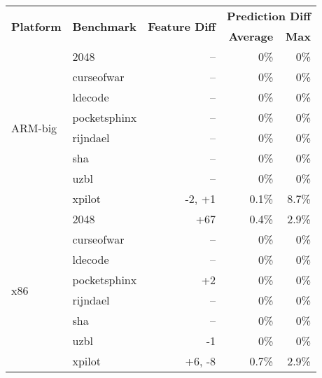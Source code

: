 \begin{tabular}{|l|l|r|r|r|}

\hline
\multirow{2}{*}{\bf Platform} & \multirow{2}{*}{\bf Benchmark} & \multirow{2}{*}{\bf Feature Diff} & \multicolumn{2}{r|}{\bf Prediction Diff} \\ \cline{4-5}
& & & {\bf Average} & {\bf Max} \\ \hline\hline

\multirow{8}{*}{ARM-big}
& 2048         & --     & 0\%   & 0\%   \\ \cline{2-5}
& curseofwar   & --     & 0\%   & 0\%   \\ \cline{2-5}
& ldecode      & --     & 0\%   & 0\%   \\ \cline{2-5}
& pocketsphinx & --     & 0\%   & 0\%   \\ \cline{2-5}
& rijndael     & --     & 0\%   & 0\%   \\ \cline{2-5}
& sha          & --     & 0\%   & 0\%   \\ \cline{2-5}
& uzbl         & --     & 0\%   & 0\%   \\ \cline{2-5}
& xpilot       & -2, +1 & 0.1\% & 8.7\% \\ \hline\hline

\multirow{8}{*}{x86}
& 2048         & +67    & 0.4\% & 2.9\% \\ \cline{2-5}
& curseofwar   & --     & 0\%   & 0\%   \\ \cline{2-5}
& ldecode      & --     & 0\%   & 0\%   \\ \cline{2-5}
& pocketsphinx & +2     & 0\%   & 0\%   \\ \cline{2-5}
& rijndael     & --     & 0\%   & 0\%   \\ \cline{2-5}
& sha          & --     & 0\%   & 0\%   \\ \cline{2-5}
& uzbl         & -1     & 0\%   & 0\%   \\ \cline{2-5}
& xpilot       & +6, -8 & 0.7\% & 2.9\% \\ \hline 

\end{tabular}
